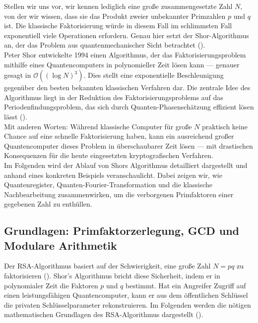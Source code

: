 Stellen wir uns vor, wir kennen lediglich eine große zusammengesetzte Zahl $N$, von der wir wissen, dass sie das Produkt zweier unbekannter Primzahlen $p$ und $q$ ist. Die klassische Faktorisierung würde in diesem Fall im schlimmsten Fall exponentiell viele Operationen erfordern. Genau hier setzt der Shor-Algorithmus an, der das Problem aus quantenmechanischer Sicht betrachtet (\cite{shor_polynomial-time_1994}).\\

Peter Shor entwickelte 1994 einen Algorithmus, der das Faktorisierungsproblem mithilfe eines Quantencomputers in polynomieller Zeit lösen kann — genauer gesagt in $\mathcal{O}((\log N)^3)$. Dies stellt eine exponentielle Beschleunigung gegenüber den besten bekannten klassischen Verfahren dar. Die zentrale Idee des Algorithmus liegt in der Reduktion des Faktorisierungsproblems auf das Periodenfindungsproblem, das sich durch Quanten-Phasenschätzung effizient lösen lässt (\cite{montanaro_quantum_2016}).\\

Mit anderen Worten: Während klassische Computer für große $N$ praktisch keine Chance auf eine schnelle Faktorisierung haben, kann ein ausreichend großer Quantencomputer dieses Problem in überschaubarer Zeit lösen — mit drastischen Konsequenzen für die heute eingesetzten kryptografischen Verfahren.\\

Im Folgenden wird der Ablauf von Shors Algorithmus detailliert dargestellt und anhand eines konkreten Beispiels veranschaulicht. Dabei zeigen wir, wie Quantenregister, Quanten-Fourier-Transformation und die klassische Nachbearbeitung zusammenwirken, um die verborgenen Primfaktoren einer gegebenen Zahl zu enthüllen.\\


\subsection{Grundlagen: Primfaktorzerlegung, GCD und Modulare Arithmetik}
Der RSA-Algorithmus basiert auf der Schwierigkeit, eine große Zahl \( N = pq \) zu faktorisieren (\cite[9-10]{milanov_rsa_2009}). Shor’s Algorithmus bricht diese Sicherheit, indem er in polynomialer Zeit die Faktoren \( p \) und \( q \) bestimmt. Hat ein Angreifer Zugriff auf einen leistungsfähigen Quantencomputer, kann er aus dem öffentlichen Schlüssel die privaten Schlüsselparameter rekonstruieren. Im Folgenden werden die nötigen mathematischen Grundlagen des RSA-Algorithmus dargestellt (\cite[4-5]{milanov_rsa_2009}).

